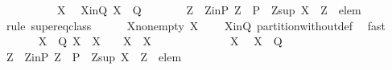 \begin{isabellebody}
\ \ \isamarkupfalse%
\ \isanewline
\ \ \ \ \isamarkupfalse%
\ X{}\ \isamarkupfalse%
\ X{}{\isacharunderscore}in{\isacharunderscore}Q{\isacharcolon}\ {\isachardoublequoteopen}X{}\ {\isasymin}\ {\isacharquery}Q{\isachardoublequoteclose}\isanewline
\ \ \ \ \isamarkupfalse%
\ \isamarkupfalse%
\ Z{}\ \ Z{}{\isacharunderscore}in{\isacharunderscore}P{\isacharcolon}\ {\isachardoublequoteopen}Z{}\ {\isasymin}\ P{\isachardoublequoteclose}\ \ Z{}{\isacharunderscore}sup{\isacharcolon}\ {\isachardoublequoteopen}X{}\ {\isacharequal}\ Z{}\ {\isacharminus}\ {\isacharbraceleft}elem{\isacharbraceright}{\isachardoublequoteclose}\isanewline
\ \ \ \ \ \ \isamarkupfalse%
\ {\isacharparenleft}rule\ super{\isacharunderscore}eq{\isacharunderscore}class{\isacharparenright}\isanewline
\ \ \ \ \isamarkupfalse%
\ X{}{\isacharunderscore}non{\isacharunderscore}empty{\isacharcolon}\ {\isachardoublequoteopen}X{}\ {\isasymnoteq}\ {\isacharbraceleft}{\isacharbraceright}{\isachardoublequoteclose}\ \isamarkupfalse%
\ X{}{\isacharunderscore}in{\isacharunderscore}Q\ partition{\isacharunderscore}without{\isacharunderscore}def\ \isamarkupfalse%
\ fast\isanewline
\ \ \ \ \isamarkupfalse%
\ {\isachardoublequoteopen}{\isasymforall}\ X{}\ {\isasymin}\ {\isacharquery}Q{\isachardot}\ X{}\ {\isasyminter}\ X{}\ {\isasymnoteq}\ {\isacharbraceleft}{\isacharbraceright}\ {\isasymlongleftrightarrow}\ X{}\ {\isacharequal}\ X{}{\isachardoublequoteclose}\ \isanewline
\ \ \ \ \isamarkupfalse%
\isanewline
\ \ \ \ \ \ \isamarkupfalse%
\ X{}\ \isamarkupfalse%
\ {\isachardoublequoteopen}X{}\ {\isasymin}\ {\isacharquery}Q{\isachardoublequoteclose}\isanewline
\ \ \ \ \ \ \isamarkupfalse%
\ \isamarkupfalse%
\ Z{}\ \ Z{}{\isacharunderscore}in{\isacharunderscore}P{\isacharcolon}\ {\isachardoublequoteopen}Z{}\ {\isasymin}\ P{\isachardoublequoteclose}\ \ Z{}{\isacharunderscore}sup{\isacharcolon}\ {\isachardoublequoteopen}X{}\ {\isacharequal}\ Z{}\ {\isacharminus}\ {\isacharbraceleft}elem{\isacharbraceright}{\isachardoublequoteclose}\isanewline

\end{isabellebody}
